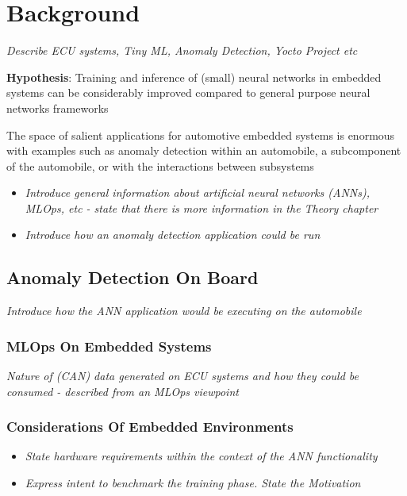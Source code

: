 \chapter{Background}
\textit{Describe ECU systems, Tiny ML, Anomaly Detection, Yocto Project etc}

\vspace{1em}
\noindent \textbf{Hypothesis}: Training and inference of (small) neural networks in embedded systems can be considerably improved compared to general purpose neural networks frameworks

{\color{red}
	The space of salient applications for automotive embedded systems is enormous with examples such as anomaly detection within an automobile, a subcomponent of the automobile, or with the interactions between subsystems
}

\begin{itemize}
	\item \textit{Introduce general information about artificial neural networks (ANNs), MLOps, etc - state that there is more information in the Theory chapter}
	\item \textit{Introduce how an anomaly detection application could be run}
\end{itemize}

\section[Anomaly Detection using Machine Learning]{Anomaly Detection On Board}
\textit{Introduce how the ANN application would be executing on the automobile}

\subsection[Machine Learning on Embedded Devices]{MLOps On Embedded Systems}
\textit{Nature of (CAN) data generated on ECU systems and how they could be consumed - described from an MLOps viewpoint }

\subsection[Considerations of Embedded Environments]{Considerations Of Embedded Environments}
\begin{itemize}
	\item \textit{State hardware requirements within the context of the ANN functionality}
	\item \textit{Express intent to benchmark the training phase. State the Motivation}
\end{itemize}

